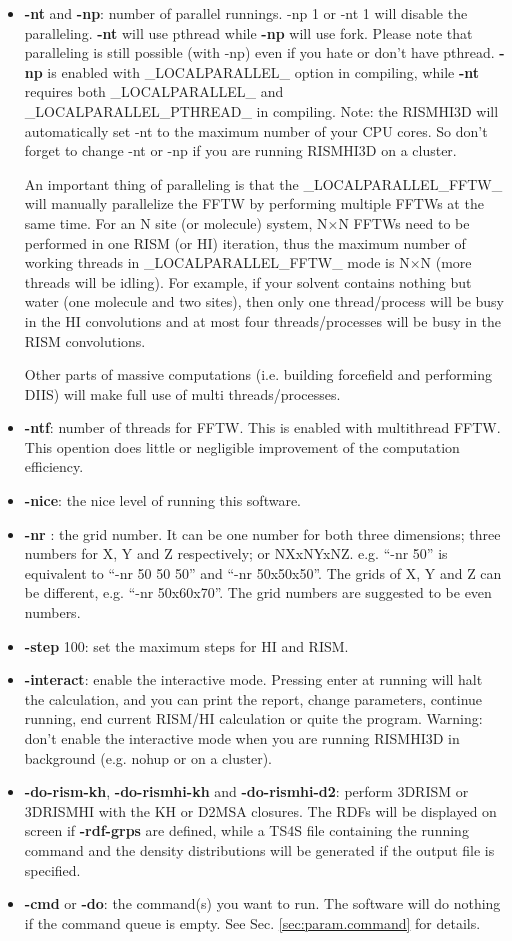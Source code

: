\documentclass[aip,amsmath,amssymb,reprint,onecolumn]{revtex4-1}
\begin{document}
\begin{itemize}
    \item {\bf -nt} and {\bf -np}: number of parallel runnings. -np 1 or -nt 1 will disable the paralleling. {\bf -nt} will use pthread while {\bf -np} will use fork. Please note that paralleling is still possible (with -np) even if you hate or don't have pthread. {\bf -np} is enabled with \_LOCALPARALLEL\_ option in compiling, while {\bf -nt} requires both \_LOCALPARALLEL\_ and \_LOCALPARALLEL\_PTHREAD\_ in compiling. Note: the RISMHI3D will automatically set -nt to the maximum number of your CPU cores. So don't forget to change -nt or -np if you are running RISMHI3D on a cluster.

        An important thing of paralleling is that the \_LOCALPARALLEL\_FFTW\_ will manually parallelize the FFTW by performing multiple FFTWs at the same time. For an N site (or molecule) system, N$\times$N FFTWs need to be performed in one RISM (or HI) iteration, thus the maximum number of working threads in \_LOCALPARALLEL\_FFTW\_ mode is N$\times$N (more threads will be idling). For example, if your solvent contains nothing but water (one molecule and two sites), then only one thread/process will be busy in the HI convolutions and at most four threads/processes will be busy in the RISM convolutions.

        Other parts of massive computations (i.e. building forcefield and performing DIIS) will make full use of multi threads/processes.
    \item {\bf -ntf}: number of threads for FFTW. This is enabled with multithread FFTW. This opention does little or negligible improvement of the computation efficiency.
    \item {\bf -nice}: the nice level of running this software.
    \item {\bf -nr }: the grid number. It can be one number for both three dimensions; three numbers for X, Y and Z respectively; or NXxNYxNZ. e.g. ``-nr 50'' is equivalent to ``-nr 50 50 50'' and ``-nr 50x50x50''. The grids of X, Y and Z can be different, e.g. ``-nr 50x60x70''. The grid numbers are suggested to be even numbers.
    \item {\bf -step} 100: set the maximum steps for HI and RISM.
    \item {\bf -interact}: enable the interactive mode. Pressing enter at running will halt the calculation, and you can print the report, change parameters, continue running, end current RISM/HI calculation or quite the program. Warning: don't enable the interactive mode when you are running RISMHI3D in background (e.g. nohup or on a cluster).
    \item {\bf -do-rism-kh}, {\bf -do-rismhi-kh} and {\bf -do-rismhi-d2}: perform 3DRISM or 3DRISMHI with the KH or D2MSA closures. The RDFs will be displayed on screen if {\bf -rdf-grps} are defined, while a TS4S file containing the running command and the density distributions will be generated if the output file is specified.
    \item {\bf -cmd} or {\bf -do}: the command(s) you want to run. The software will do nothing if the command queue is empty. See Sec. \ref{sec:param.command} for details.
\end{itemize}
\end{document}

